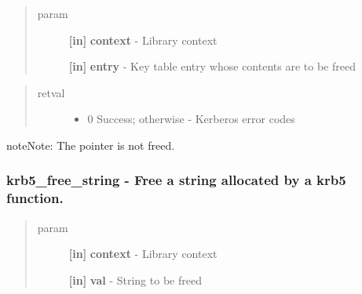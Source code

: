 \documentclass[letterpaper,10pt,english]{sphinxmanual}
\begin{document}
\begin{quote}\begin{description}
\item[{param}] \leavevmode
\textbf{{[}in{]}} \textbf{context} - Library context

\textbf{{[}in{]}} \textbf{entry} - Key table entry whose contents are to be freed

\end{description}\end{quote}
\begin{quote}\begin{description}
\item[{retval}] \leavevmode\begin{itemize}
\item {} 
0   Success; otherwise - Kerberos error codes

\end{itemize}

\end{description}\end{quote}

\begin{notice}{note}{Note:}
The pointer is not freed.
\end{notice}


\subsubsection{krb5\_free\_string -  Free a string allocated by a krb5 function.}
\label{appdev/refs/api/krb5_free_string:krb5-free-string-free-a-string-allocated-by-a-krb5-function}\label{appdev/refs/api/krb5_free_string::doc}

\begin{fulllineitems}
\label{appdev/refs/api/krb5_free_string:c.krb5_free_string}
\end{fulllineitems}

\begin{quote}\begin{description}
\item[{param}] \leavevmode
\textbf{{[}in{]}} \textbf{context} - Library context

\textbf{{[}in{]}} \textbf{val} - String to be freed

\end{description}\end{quote}
\end{document}
